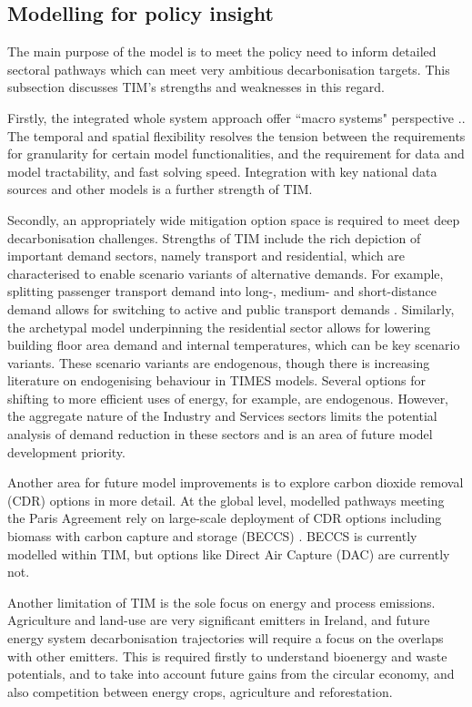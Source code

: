 \documentclass[journal abbreviation, manuscript]{copernicus}
\begin{document}
\subsection{Modelling for policy insight}
The main purpose of the model is to meet the policy need to inform detailed sectoral pathways which can meet very ambitious decarbonisation targets. This subsection discusses TIM's strengths and weaknesses in this regard. 

Firstly, the integrated whole system approach offer ``macro systems" perspective .. The temporal and spatial flexibility resolves the tension between the requirements for granularity for certain model functionalities, and the requirement for data and model tractability, and fast solving speed. Integration with key national data sources and other models is a further strength of TIM. 

Secondly, an appropriately wide mitigation option space is required to meet deep decarbonisation challenges. Strengths of TIM include the rich depiction of important demand sectors, namely transport and residential, which are characterised to enable scenario variants of alternative demands. For example, splitting passenger transport demand into long-, medium- and short-distance demand allows for switching to active and public transport demands . Similarly, the archetypal model underpinning the residential sector allows for lowering building floor area demand and internal temperatures, which can be key scenario variants. These scenario variants are endogenous, though there is increasing literature on endogenising behaviour in TIMES models. Several options for shifting to more efficient uses of energy, for example, are endogenous. However, the aggregate nature of the Industry and Services sectors limits the potential analysis of demand reduction in these sectors and is an area of future model development priority.

Another area for future model improvements is to explore carbon dioxide removal (CDR) options in more detail. At the global level, modelled pathways meeting the Paris Agreement rely on large-scale deployment of CDR options including biomass with carbon capture and storage (BECCS) \cite{IPCC2018}. BECCS is currently modelled within TIM, but options like Direct Air Capture (DAC)\cite{Realmonte2019} are currently not.

Another limitation of TIM is the sole focus on energy and process emissions. Agriculture and land-use are very significant emitters in Ireland, and future energy system decarbonisation trajectories will require a focus on the overlaps with other emitters. This is required firstly to understand bioenergy and waste potentials, and to take into account future gains from the circular economy, and also competition between energy crops, agriculture and reforestation.
\end{document}
